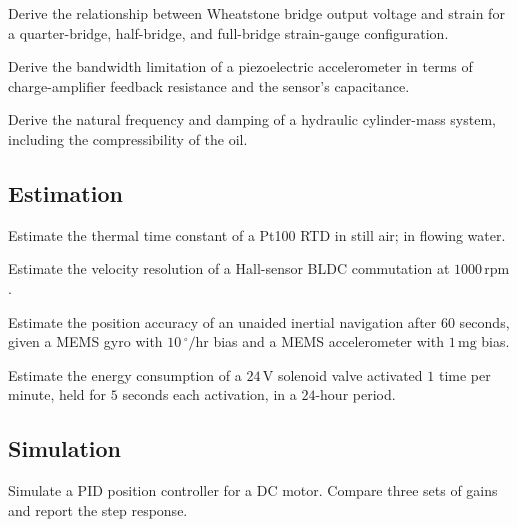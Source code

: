 \begin{exercise}
Derive the relationship between Wheatstone bridge output voltage and strain for a quarter-bridge, half-bridge, and full-bridge strain-gauge configuration.
\end{exercise}

\begin{exercise}
Derive the bandwidth limitation of a piezoelectric accelerometer in terms of charge-amplifier feedback resistance and the sensor's capacitance.
\end{exercise}

\begin{exercise}
Derive the natural frequency and damping of a hydraulic cylinder-mass system, including the compressibility of the oil.
\end{exercise}

\subsection*{Estimation}

\begin{exercise}
Estimate the thermal time constant of a Pt100 RTD in still air; in flowing water.
\end{exercise}

\begin{exercise}
Estimate the velocity resolution of a Hall-sensor BLDC commutation at $1000\,\text{rpm}$.
\end{exercise}

\begin{exercise}
Estimate the position accuracy of an unaided inertial navigation after $60$ seconds, given a MEMS gyro with $10\,^\circ/\text{hr}$ bias and a MEMS accelerometer with $1\,\text{mg}$ bias.
\end{exercise}

\begin{exercise}
Estimate the energy consumption of a $24\,\text{V}$ solenoid valve activated $1$ time per minute, held for $5$ seconds each activation, in a $24$-hour period.
\end{exercise}

\subsection*{Simulation}

\begin{exercise}
Simulate a PID position controller for a DC motor. Compare three sets of gains and report the step response.
\end{exercise}

